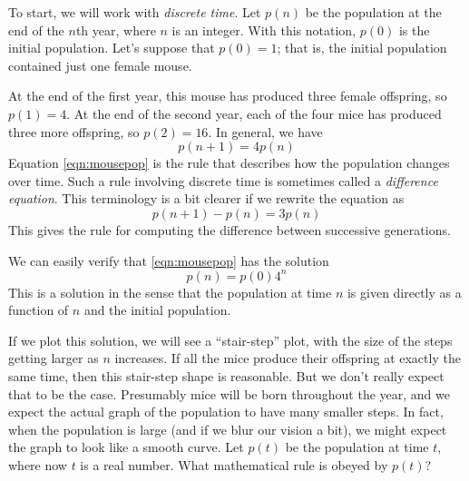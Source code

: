 To start, we will work with
\emph{discrete time}.
Let $p(n)$ be the population at the end of the
$n$th year, where $n$ is an integer.
With this notation, $p(0)$ is the initial population.
Let's suppose that $p(0)=1$; that is, the initial
population contained just one female mouse.

At the end of the first year, this mouse has produced
three female offspring,
so $p(1) = 4$.  At the end of the second year,
each of the four mice has produced three more offspring,
so $p(2) = 16$.
In general, we have
\begin{equation}
   p(n+1) = 4p(n)
\label{eqn:mousepop}
\end{equation}
Equation \eqref{eqn:mousepop} is the rule that describes
how the population changes over time.  Such a rule
involving discrete time is sometimes called 
a \emph{difference equation}.
This terminology is a bit clearer if we rewrite the
equation as
\begin{equation}
    p(n+1)-p(n) = 3p(n)
\label{eqn:mousepopdiff}
\end{equation}
This gives the rule for computing the difference
between successive generations.

We can easily verify that \eqref{eqn:mousepop}
has the solution
\begin{equation}
   p(n) = p(0)4^n
\label{eqn:mousepopsol}
\end{equation}
This is a solution in the sense that the 
population at time $n$ is given directly
as a function of $n$ and the initial
population.

If we plot this solution, we will see
a ``stair-step'' plot, with the size of
the steps getting larger as $n$ increases.
If all the mice produce their offspring
at exactly the same time, then this stair-step
shape is reasonable. But we don't really expect
that to be the case.  Presumably mice will
be born throughout the year, and we expect the
actual graph of the population to have many smaller steps.
In fact, when the
population is large (and if we blur our vision
a bit), we might expect the graph to look like
a smooth curve.
Let $p(t)$ be the population at time $t$, where
now $t$ is a real number.
What mathematical
rule is obeyed by $p(t)$?


